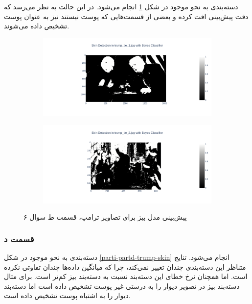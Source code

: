 \documentclass{article}
\begin{document}
دسته‌بندی به نحو موجود در شکل \ref{parti-partc-trump-skin} انجام می‌شود. در این حالت به نظر می‌رسد که
دقت پیش‌بینی افت کرده و بعضی از قسمت‌هایی که پوست نیستند نیز به عنوان پوست تشخیص داده می‌شوند.

\begin{figure}[h]
    \begin{subfigure}{.45\linewidth}
        \centering
        \includegraphics[width=\linewidth]{images/q6/parti_trump_partc.png}
    \end{subfigure}
    \hfill
    \begin{subfigure}{.45\linewidth}
        \centering
        \includegraphics[width=\linewidth]{images/q6/parti_trump_partc2.png}
    \end{subfigure}
    \caption{پیش‌بینی مدل بیز برای تصاویر ترامپ، قسمت ط سوال ۶}
    \label{parti-partc-trump-skin}
\end{figure}

\subsubsection*{قسمت د}

دسته‌بندی به نحو موجود در شکل \ref{parti-partd-trump-skin} انجام می‌شود. تنایج متناظر این دسته‌بندی چندان تغییر نمی‌کند،
چرا که میانگین داده‌ها چندان تفاوتی نکرده است. اما همچنان نرخ خطای این دسته‌بند نسبت به دسته‌بند بیز کم‌تر است. برای مثال
دسته‌بند بیز در تصویر  دیوار را به درستی غیر پوست تشخیص داده است اما دسته‌بند 
دیوار را به اشتباه پوست تشخیص داده است.
\end{document}
